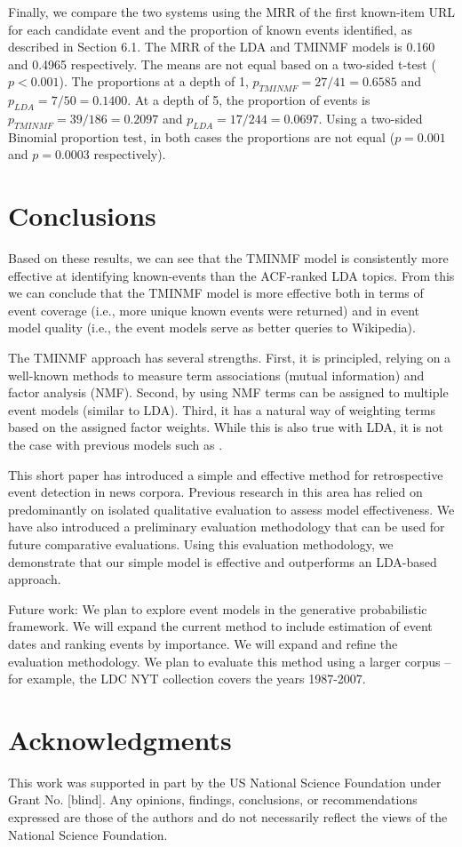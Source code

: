 \documentclass{sig-alternate}
\begin{document}
Finally, we compare the two systems using the MRR of the first known-item URL for each candidate event and the proportion of known events identified, as described in Section 6.1.  The MRR of the LDA and TMINMF models is 0.160 and 0.4965 respectively. The means are not equal based on a two-sided t-test ($p < 0.001$).   The proportions at a depth of 1,   $p_{TMINMF}=27/41=0.6585$ and $p_{LDA}=7/50=0.1400$.  At a depth of 5, the proportion of events is $p_{TMINMF}=39/186=0.2097$ and $p_{LDA}=17/244=0.0697$. Using a two-sided Binomial proportion test, in both cases the proportions are not equal ($p = 0.001$ and $p = 0.0003$ respectively).


\section{Conclusions}

Based on these results, we can see that the TMINMF model is consistently more effective at identifying known-events than the ACF-ranked LDA topics.  From this we can conclude that the TMINMF model is more effective both in terms of event coverage (i.e., more unique known events were returned) and in event model quality (i.e., the event models serve as better queries to Wikipedia).  

The TMINMF approach has several strengths. First, it is principled, relying on a well-known methods to measure term associations (mutual information) and factor analysis (NMF). Second, by using NMF terms can be assigned to multiple event models (similar to LDA).  Third, it has a natural way of weighting terms based on the assigned factor weights. While this is also true with LDA, it is not the case with previous models such as \cite{He2007}.  

This short paper has introduced a simple and effective method for retrospective event detection in news corpora. Previous research in this area has relied on predominantly on isolated qualitative evaluation to assess model effectiveness. We have also introduced a preliminary evaluation methodology that can be used for future comparative evaluations. Using this evaluation methodology, we demonstrate that our simple model is effective and outperforms an LDA-based approach. 

Future work: We plan to explore event models in the generative probabilistic framework. We will expand the current method to include estimation of event dates and ranking events by importance. We will expand and refine the evaluation methodology. We plan to evaluate this method using a larger corpus -- for example, the LDC NYT collection covers the years 1987-2007.


\section{Acknowledgments}
This work was supported in part by the US National Science Foundation under Grant No. [blind]. Any opinions, findings, conclusions, or recommendations expressed are those of the authors and do not necessarily reflect the views of the National Science Foundation.



  
\end{document}
